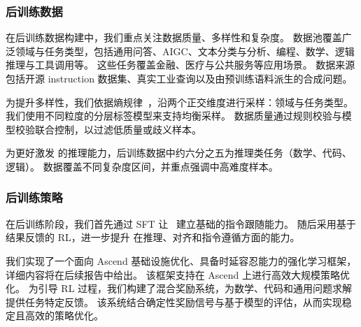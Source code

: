 \subsubsection{后训练数据}
在后训练数据构建中，我们重点关注数据质量、多样性和复杂度。
数据池覆盖广泛领域与任务类型，包括通用问答、AIGC、文本分类与分析、编程、数学、逻辑推理与工具调用等。
这些任务覆盖金融、医疗与公共服务等应用场景。
数据来源包括开源 instruction 数据集、真实工业查询以及由预训练语料派生的合成问题。

为提升多样性，我们依据熵规律~\cite{yin2024entropy}，沿两个正交维度进行采样：领域与任务类型。
我们使用不同粒度的分层标签模型来支持均衡采样。
数据质量通过规则校验与模型校验联合控制，以过滤低质量或歧义样本。

为更好激发 \modelname 的推理能力，后训练数据中约六分之五为推理类任务（数学、代码、逻辑）。
数据覆盖不同复杂度区间，并重点强调中高难度样本。



\subsubsection{后训练策略}
在后训练阶段，我们首先通过 SFT 让 \modelname~建立基础的指令跟随能力。
随后采用基于结果反馈的 RL，进一步提升 \modelname 在推理、对齐和指令遵循方面的能力。


我们实现了一个面向 Ascend 基础设施优化、具备时延容忍能力的强化学习框架，详细内容将在后续报告中给出。
该框架支持在 Ascend 上进行高效大规模策略优化。
为引导 RL 过程，我们构建了混合奖励系统，为数学、代码和通用问题求解提供任务特定反馈。
该系统结合确定性奖励信号与基于模型的评估，从而实现稳定且高效的策略优化。
